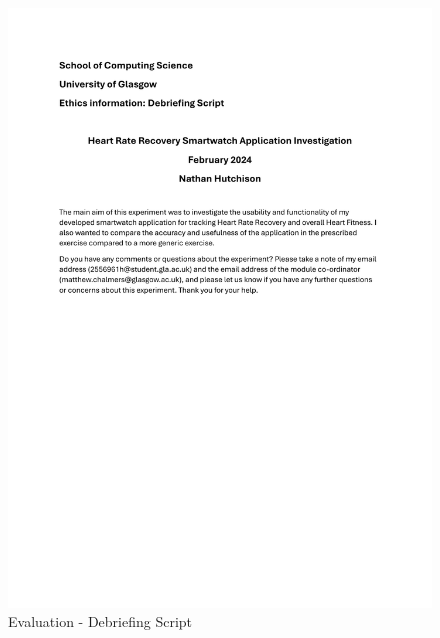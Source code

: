 \documentclass{l4proj}
\begin{document}
\begin{figure}[h!]
    \centering
    \includegraphics[width=1\linewidth]{dissertation//dissImages/DebriefingScript.pdf}
    \caption{Evaluation - Debriefing Script}
\end{figure}
\end{document}
